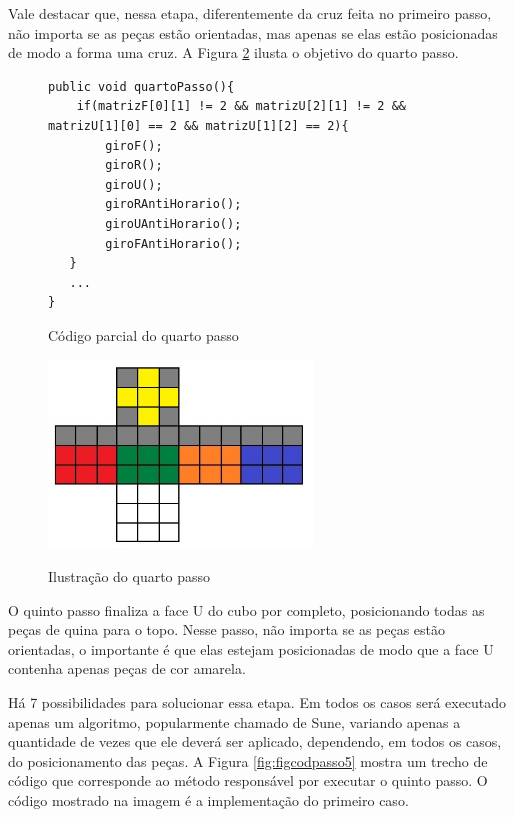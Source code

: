 Vale destacar que, nessa etapa, diferentemente da cruz feita no primeiro passo, não importa se as peças estão orientadas, mas apenas se elas estão posicionadas de modo a forma uma cruz. A Figura \ref{fig:quartoPasso} ilusta o objetivo do quarto passo. 

\begin{figure}[!htb]
\begin{lstlisting}
public void quartoPasso(){
    if(matrizF[0][1] != 2 && matrizU[2][1] != 2 && matrizU[1][0] == 2 && matrizU[1][2] == 2){
        giroF();
        giroR();
        giroU(); 
        giroRAntiHorario();
        giroUAntiHorario();
        giroFAntiHorario();
   }
   ...
}
\end{lstlisting}\caption{Código parcial do quarto passo}
\label{fig:figcodds1}
\end{figure}




\begin{figure}[!htb]
    \centering
    {
        \includegraphics[height=5cm]{imagens/quartopasso.jpg}
        \label{figFront}
    }
    
\caption{Ilustração do quarto passo}
\label{fig:quartoPasso}
\end{figure}


O quinto passo finaliza a face U do cubo por completo, posicionando todas as peças de quina para o topo. Nesse passo, não importa se as peças estão orientadas, o importante é que elas estejam posicionadas de modo que a face U contenha apenas peças de cor amarela.



Há 7 possibilidades para solucionar essa etapa. Em todos os casos será executado apenas um algoritmo, popularmente chamado de Sune, variando apenas a quantidade de vezes que ele deverá ser aplicado, dependendo, em todos os casos, do posicionamento das peças. A Figura \ref{fig:figcodpasso5} mostra um trecho de código que corresponde ao método responsável por executar o quinto passo. O código mostrado na imagem é a implementação do primeiro caso.


